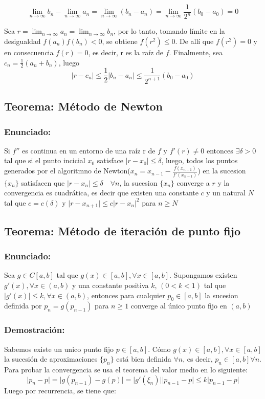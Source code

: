 \documentclass[a4paper,12pt]{article}
\begin{document}
\[
 \lim_{n \to \infty}b_n - \lim_{n \to \infty}a_n= \lim_{n \to \infty}(b_n-a_n)=\lim_{n \to \infty}\frac{1}{2^n}(b_0-a_0)=0
\]

Sea $r=\lim_{n \to \infty}a_n=\lim_{n \to \infty}b_n$, por lo tanto, tomando límite en la desigualdad $f(a_n)f(b_n)<0$, se obtiene $f(r^2)\leq 0$. De allí que $f(r^2)=0$ y en consecuencia $f(r)=0$, es decir, r es la raíz de $f$. Finalmente, sea $c_n=\frac{1}{2}(a_n+b_n)$, luego 
\[
\lvert r-c_n \rvert \leq \frac{1}{2}\lvert b_n-a_n\rvert \leq \frac{1}{2^{n+1}}(b_0-a_0)
\]

\subsection{Teorema: Método de Newton}
\subsubsection{Enunciado:}
Si $f''$ es continua en un entorno de una raíz r de $f$ y $f'(r)\neq 0$ entonces $\exists \delta >0$ tal que si el punto incicial $x_0$ satisface $\lvert r-x_0 \rvert \leq \delta$, luego, todos los puntos generados por el algoritmno de Newton($x_n=x_{n-1}-\frac{f(x_{n-1})}{f'(x_{n-1})}$) en la sucesion $\{x_n\}$ satisfacen que $\lvert r-x_n \rvert \leq\delta \quad \forall n$, la sucesion $\{x_n\}$ converge a $r$ y la convergencia es cuadrática, es decir que existen una constante $c$ y un natural $N$ tal que $c=c(\delta)$ y $\lvert r-x_{n+1}\rvert \leq c\lvert r-x_n\rvert ^2$ para $n \geq N$

\subsection{Teorema: Método de iteración de punto fijo}
\subsubsection{Enunciado:}
Sea $g \in C[a,b]$ tal que $g(x)\in [a,b], \forall x \in [a,b]$. Supongamos existen $g'(x), \forall x \in (a,b)$ y una constante positiva $k$, $(0<k<1)$ tal que $\lvert g'(x)\rvert \leq k, \forall x \in (a,b)$, entonces para cualquier $p_0\in [a,b]$ la sucesion definida por $p_n=g(p_{n-1})$ para $n \geq 1$ converge al único punto fijo en $(a,b)$ 

\subsubsection{Demostración:}
Sabemos existe un unico punto fijo $p \in [a,b]$. Cómo $g(x) \in [a,b], \forall x \in [a,b]$ la sucesión de aproximaciones $\{p_n\}$ está bien definida $\forall n$, es decir, $p_n \in [a,b] \forall n$. Para probar la convergencia se usa el teorema del valor medio en lo siguiente:
\[
\lvert p_n-p\rvert = \lvert g(p_{n-1})-g(p)\rvert = \lvert g'(\xi_n ) \rvert \lvert p_{n-1}-p \rvert \leq k \lvert p_{n-1}-p\rvert
\]
Luego por recurrencia, se tiene que:
\end{document}
